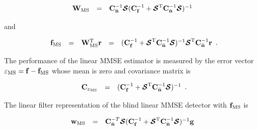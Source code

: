 \documentclass[a4paper,11pt,fleqn]{article}
\newcommand{\br}{{\mathbf r}}
\newcommand{\bC}{{\bf C}}
\newcommand{\bg}{{\bf g}}
\newcommand{\bn}{{\bf n}}
\newcommand{\bw}{{\bf w}}
\newcommand{\bbf}{{\bf f}}
\newcommand{\bW}{{\bf W}}
\newcommand{\bcS}{{\mbox {\boldmath ${\cal S}$}}}
\begin{document}
\begin{equation}
\begin{array}{rcl}
{\bW}_{\rm MS} &=&
\bC_{\bar{\bn}}^{-1}\bcS(\bC_{\bbf}^{-1}+\bcS^{\rm
T}\bC_{\bar{\bn}}^{-1}\bcS)^{-1}
\end{array}\label{W_MSE}
\end{equation}

\noindent and

\begin{equation}
\begin{array}{rcccl}
{\bbf}_{\rm MS} &=&{\bW}_{\rm MS}^{\rm T}\br
&=&(\bC_{\bbf}^{-1}+\bcS^{\rm
T}\bC_{\bar{\bn}}^{-1}\bcS)^{-1}\bcS^{\rm
T}\bC_{\bar{\bn}}^{-1}\br
\end{array}. \label{MSE}
\end{equation}

\noindent The performance of the linear MMSE estimator is measured
by the error vector $\mathbf{\varepsilon_{\rm MS}}=\bbf-\bbf_{\rm
MS}$ whose mean is zero and covariance matrix is

\begin{equation}
\begin{array}{rcl}
\bC_{\mathbf{\varepsilon_{\rm MS}}} &=& (\bC_{\bbf}^{-1}+\bcS^{\rm
T}\bC_{\bar{\bn}}^{-1}\bcS)^{-1}
\end{array}.
\end{equation}

The linear filter representation of the blind linear MMSE detector
with $\bbf_{\rm MS}$ is

\begin{equation}
\begin{array}{rcl}
{\bw}_{\rm MS}&=&
\bC_{\bar{\bn}}^{-T}\bcS(\bC_{\bbf}^{-1}+\bcS^{\rm
T}\bC_{\bar{\bn}}^{-1}\bcS)^{-1}\bg
\end{array} \label{w_MSE}
\end{equation}

\pagebreak
\end{document}

